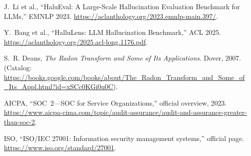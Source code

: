 \documentclass[11pt]{article}
\begin{document}
\begin{thebibliography}{99}
J.~Li et al., ``HaluEval: A Large-Scale Hallucination Evaluation Benchmark for LLMs,'' EMNLP 2023. \url{https://aclanthology.org/2023.emnlp-main.397/}.

Y.~Bang et al., ``HalluLens: LLM Hallucination Benchmark,'' ACL 2025. \url{https://aclanthology.org/2025.acl-long.1176.pdf}.

S.~R. Deans, \emph{The Radon Transform and Some of Its Applications}. Dover, 2007. (Catalog: \url{https://books.google.com/books/about/The_Radon_Transform_and_Some_of_Its_Appl.html?id=xSCc0KGi0u0C}).

AICPA, ``SOC~2---SOC for Service Organizations,'' official overview, 2023. \url{https://www.aicpa-cima.com/topic/audit-assurance/audit-and-assurance-greater-than-soc-2}.

ISO, ``ISO/IEC 27001: Information security management systems,'' official page. \url{https://www.iso.org/standard/27001}.
\end{thebibliography}
\end{document}
